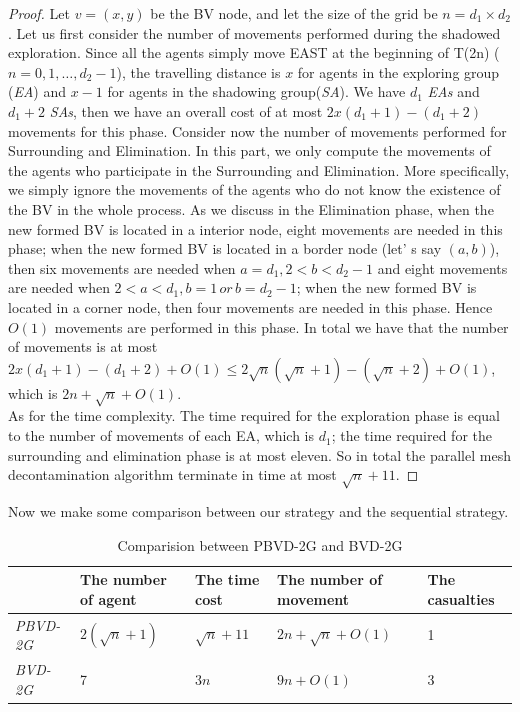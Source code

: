 \begin{proof}
Let $v=(x, y)$ be the BV node, and let the size of the grid be $n=d_1\times d_2$. Let us first consider the number of movements performed during the shadowed exploration. Since all the agents simply move EAST at the beginning of T(2n) ($n=0,1, \dots , d_2-1$), the travelling distance is $x$ for agents in the exploring group ({\em EA}) and $x-1$ for agents in the shadowing group({\em SA}). We have $d_1$ {\em EAs} and $d_1+2$ {\em SAs}, then we have an overall cost of at most $2x(d_1+1)-(d_1+2)$ movements for this phase.
Consider now the number of movements performed for Surrounding and Elimination. In this part, we only compute the movements of the agents who participate in the Surrounding and Elimination. More specifically, we simply ignore the movements of the agents who do not know the existence of the BV in the whole process. As we discuss in the Elimination phase, when the new formed BV is located in a interior node, eight movements are needed in this phase; when the new formed BV is located in a border node (let' s say $(a, b)$), then six movements are needed when $a=d_1, 2< b <d_2-1$ and eight movements are needed when $2< a <d_1,b=1\,or\,b=d_2-1$; when the new formed BV is located in a corner node, then four movements are needed in this phase. Hence $O(1)$ movements are performed in this phase.
In total we have that the number of movements is at most $2x(d_1+1)-(d_1+2)+O(1)\leq 2\sqrt{n}( \sqrt{n}+1)-(\sqrt{n}+2)+O(1)$, which is $2n+\sqrt{n}+O(1)$.\\
As for the time complexity. The time required for the exploration phase is equal to the number of movements of each EA, which is $d_1$; the time required for the surrounding and elimination phase is at most eleven. So in total the parallel mesh decontamination algorithm terminate in time at most $\sqrt{n}+11$. 
\end{proof}

Now we make some comparison between our strategy and the sequential strategy.

\begin{table} [hbtp]
\caption{Comparision between PBVD-2G and BVD-2G}
\label{table:ComparisionPBVD-2GandBVD-2G}
\centering
\tabulinesep=2mm
\begin{tabu} to 140 mm {|X[6,c]|X[4,l]|X[4,l]|X[4,l]|X[4,l]|} \hline 
& The number of agent & The time cost & The number of movement & The casualties \\ \hline
{\em PBVD-2G}   &$2(\sqrt{n}+1)$& $\sqrt{n}+11$   & $2n+\sqrt{n}+O(1)$   & 1        \\ \hline
{\em BVD-2G} & 7    & $3n$          & $9n+O(1)$     & 3              \\ \hline
\end{tabu}
\end{table}

